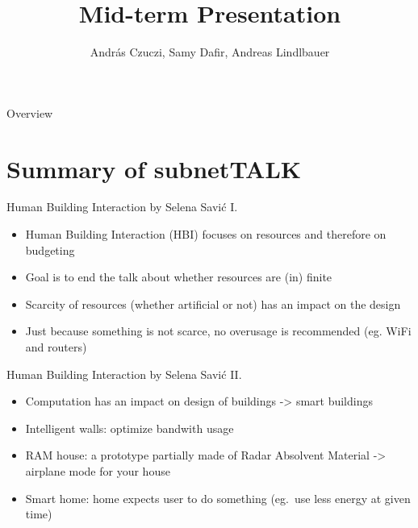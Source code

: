 \documentclass[10pt]{beamer}
\title{Mid-term Presentation}
\author{András Czuczi, Samy Dafir, Andreas Lindlbauer} %
\date{}
\begin{document}
\begin{frame}
	\maketitle 
\end{frame}


\begin{frame}{Overview}
	\tableofcontents
\end{frame}


\section{Summary of subnetTALK}


\begin{frame}{Human Building Interaction by Selena Savić I.} 
	\begin{itemize}
        \pause{}
		\item Human Building Interaction (HBI) focuses on resources and therefore on budgeting
		\pause{}
		\item Goal is to end the talk about whether resources are (in) finite
		\pause{}
		\item Scarcity of resources (whether artificial or not) has an impact on the design
		\pause{}
		\item Just because something is not scarce, no overusage is recommended (eg. WiFi and routers)
	\end{itemize}	
\end{frame}


\begin{frame}{Human Building Interaction by Selena Savić II.}
	\begin{itemize}
        \pause{}
		\item Computation has an impact on design of buildings -> smart buildings
		\pause{}
		\item Intelligent walls: optimize bandwith usage
		\pause{}
		\item RAM house: a prototype partially made of Radar Absolvent Material -> airplane mode for your house
		\pause{}
		\item Smart home: home expects user to do something (eg.\ use less energy at given time)
	\end{itemize}	
\end{frame}
\end{document}

